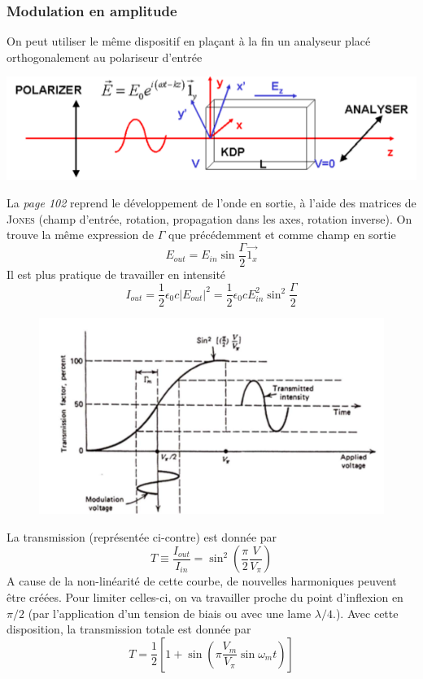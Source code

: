 \subsubsection{Modulation en amplitude}
On peut utiliser le même dispositif en plaçant à la fin un analyseur placé orthogonalement au polariseur
d'entrée
\begin{center}
	\includegraphics[scale=0.5]{ch6/image4}
\end{center}
La \textit{page 102} reprend le développement de l'onde en sortie, à l'aide des matrices de 
\textsc{Jones} (champ d'entrée, rotation, propagation dans les axes, rotation inverse). On trouve la
même expression de $\Gamma$ que précédemment et comme champ en sortie
\begin{equation}
E_{out} = E_{in}\sin\dfrac{\Gamma}{2}\vec{1_x}
\end{equation}
Il est plus pratique de travailler en intensité
\begin{equation}
I_{out} = \frac{1}{2}\epsilon_0c|E_{out}|^2 = \frac{1}{2}\epsilon_0c E_{in}^2\sin^2\frac{\Gamma}{2}
\end{equation}

	\begin{figure}
	\vspace{-5mm}
	\includegraphics[scale=0.4]{ch6/image5}
	\end{figure}
La transmission (représentée ci-contre) est donnée par
\begin{equation}
T \equiv \dfrac{I_{out}}{I_{in}} = \sin^2\left(\dfrac{\pi}{2}\dfrac{V}{V_\pi}\right)
\end{equation}
A cause de la non-linéarité de cette courbe, de nouvelles harmoniques peuvent être créées. Pour 
limiter celles-ci, on va travailler proche du point d’inflexion en $\pi/2$ (par l'application 
d'un tension de biais ou avec une lame $\lambda/4$.). Avec cette disposition, la transmission totale
est donnée par
\begin{equation}
T = \dfrac{1}{2}\left[1+\sin\left(\pi\dfrac{V_m}{V_\pi}\sin\omega_mt\right)\right]
\label{eq:6.38}
\end{equation}

